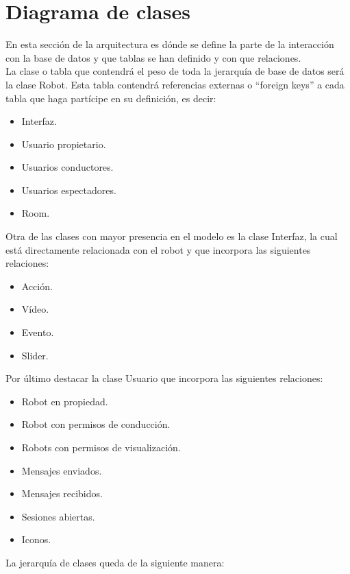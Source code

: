 \pagebreak

\section{Diagrama de clases}

En esta sección de la arquitectura es dónde se define la parte de la interacción con la base de
datos y que tablas se han definido y con que relaciones.\\


La clase o tabla que contendrá el peso de toda la jerarquía de base de datos será la clase Robot. Esta tabla contendrá referencias externas o “foreign keys” a cada tabla que
haga partícipe en su definición, es decir:

\begin{itemize}
 \item Interfaz.
 \item Usuario propietario.
 \item Usuarios conductores.
 \item Usuarios espectadores.
 \item Room.
\end{itemize}

Otra de las clases con mayor presencia en el modelo es la clase Interfaz, la cual está directamente relacionada con el robot y que incorpora las siguientes relaciones:

\begin{itemize}
 \item Acción.
 \item Vídeo.
 \item Evento.
 \item Slider.
\end{itemize}

Por último destacar la clase Usuario que incorpora las siguientes relaciones:

\begin{itemize}
 \item Robot en propiedad.
 \item Robot con permisos de conducción.
 \item Robots con permisos de visualización.
 \item Mensajes enviados.
 \item Mensajes recibidos.
 \item Sesiones abiertas.
 \item Iconos.
\end{itemize}


La jerarquía de clases queda de la siguiente manera:

